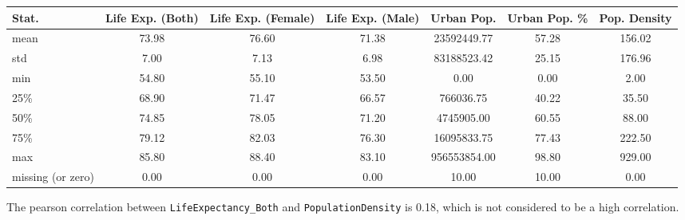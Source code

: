 \documentclass[14pt]{extarticle}
\begin{document}
{\scriptsize
\begin{center}
\begin{tabular}{ |l|c|c|c|c|c|c| }
  \hline
  Stat.&Life Exp. (Both)&Life Exp. (Female)&Life Exp. (Male)&Urban Pop.&Urban Pop. \%&Pop. Density\\
  \hline
  mean             &73.98 &  76.60  &  71.38  &  23592449.77  &    57.28  &  156.02\\
  std              & 7.00 &   7.13  &   6.98  &  83188523.42  &    25.15  &  176.96\\
  min              &54.80 &  55.10  &  53.50  &         0.00  &     0.00  &    2.00\\
  25\%             &68.90 &  71.47  &  66.57  &    766036.75  &    40.22  &   35.50\\
  50\%             &74.85 &  78.05  &  71.20  &   4745905.00  &    60.55  &   88.00\\
  75\%             &79.12 &  82.03  &  76.30  &  16095833.75  &    77.43  &  222.50\\
  max              &85.80 &  88.40  &  83.10  & 956553854.00  &    98.80  &  929.00\\
  missing (or zero)& 0.00 &   0.00  &   0.00  &   10.00       &     10.00 &    0.00\\
  \hline
\end{tabular}
\end{center}}

The pearson correlation between \texttt{LifeExpectancy\_Both} and \texttt{PopulationDensity} is 0.18,
which is not considered to be a high correlation.
\end{document}
